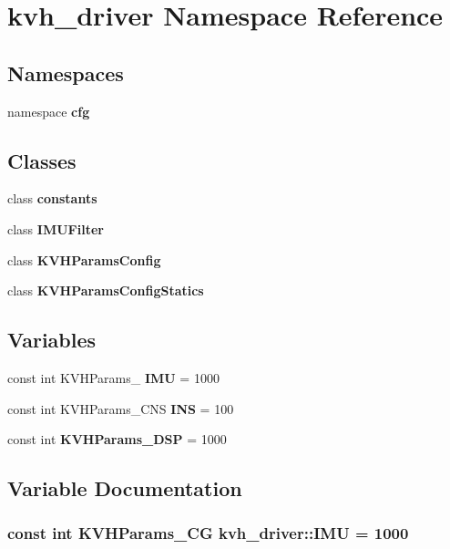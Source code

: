 \section{kvh\-\_\-driver \-Namespace \-Reference}
\label{namespacekvh__driver}
\subsection*{\-Namespaces}
\begin{DoxyCompactItemize}
\item 
namespace {\bf cfg}
\end{DoxyCompactItemize}
\subsection*{\-Classes}
\begin{DoxyCompactItemize}
\item 
class {\bf constants}
\item 
class {\bf \-I\-M\-U\-Filter}
\item 
class {\bf \-K\-V\-H\-Params\-Config}
\item 
class {\bf \-K\-V\-H\-Params\-Config\-Statics}
\end{DoxyCompactItemize}
\subsection*{\-Variables}
\begin{DoxyCompactItemize}
\item 
const int \-K\-V\-H\-Params\-\_ {\bf \-I\-M\-U} = 1000
\item 
const int \-K\-V\-H\-Params\-\_\-\-C\-N\-S {\bf \-I\-N\-S} = 100
\item 
const int {\bf \-K\-V\-H\-Params\-\_\-\-D\-S\-P} = 1000
\end{DoxyCompactItemize}


\subsection{\-Variable \-Documentation}
\subsubsection[{\-I\-M\-U}]{\setlength{\rightskip}{0pt plus 5cm}const int \-K\-V\-H\-Params\-\_\-\-C\-G {\bf kvh\-\_\-driver\-::\-I\-M\-U} = 1000}\label{namespacekvh__driver_a0fd5a58a43bdfb53060a96905f42b535}


